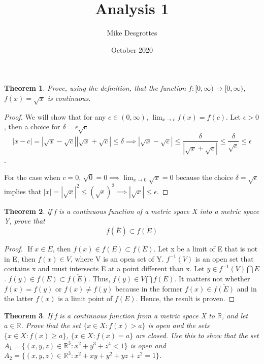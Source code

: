 \documentclass{article}
\title{Analysis 1}
\author{Mike Desgrottes}
\date{October 2020}
\theoremstyle{plain}
\newtheorem{theorem}{Theorem}
\theoremstyle{definition}
\begin{document}
\maketitle
 \section{}

 \begin{theorem}
	 Prove, using the definition, that the function $f:[0,\infty) \to [0, \infty)$, $f(x) = \sqrt{x}$ is continuous.
 \end{theorem}

 \begin{proof}
	 We will show that for any $c \in (0,\infty)$, $\lim_{x \to c} f(x) = f(c)$. Let $\epsilon > 0$, then a choice for $\delta = \epsilon\sqrt{c}$ $$ |x - c| = |\sqrt{x} - \sqrt{c}||\sqrt{x} + \sqrt{c}| \leq \delta \implies |\sqrt{x} - \sqrt{c}| \leq \frac{\delta}{|\sqrt{x} + \sqrt{c}|} \leq \frac{\delta}{\sqrt{c}}\leq \epsilon$$. 

	 For the case when $c = 0$, $\sqrt{0} = 0 \implies \lim_{x \to 0} \sqrt{x} = 0$ because the choice $\delta = \sqrt{\epsilon}$ implies that $|x| = |\sqrt{x}|^{2} \leq (\sqrt{\epsilon})^{2} \implies |\sqrt{x}| \leq \epsilon$.
 \end{proof}

\begin{theorem}
	if f is a continuous function of a metric space X into a metric space Y, prove that $$f(\overline{E}) \subset  \overline{f(E)} $$
\end{theorem}

\begin{proof}
	$ $\newline
	 If $x \in E$, then $f(x) \in f(E) \subset \overline{f(E)}$. Let x be a limit of E that is not in E, then $f(x) \in V$, where V is an open set of Y. $f^{-1}(V)$ is an open set that contains x and must intersects E at a point different than x. Let $y \in f^{-1}(V) \bigcap E$. $f(y) \in f(E) \subset \overline{f(E)}$. Thus, $f(y) \in V \bigcap f(E)$. It matters not whether $f(x) = f(y)$ or $f(x) \not = f(y)$ because in the former $f(x) \in \overline{f(E)}$ and in the latter $f(x)$ is a limit point of $f(E)$. Hence, the result is proven. 
\end{proof}
 \begin{theorem}
	 If f is a continuous function from a metric space X to $\mathbb{R}$, and let $a \in \mathbb{R}$. Prove that the set $\{ x\in X: f(x) > a\}$ is open and the sets $\{x \in X: f(x) \geq a\}$, $\{x \in X: f(x) = a \}$ are closed. Use this to show that the set $A_{1} = \{(x,y,z) \in \mathbb{R}^{3}: x^{2} + y^{3} + z^{4} < 1\}$ is open and $A_{2} = \{ (x,y,z) \in \mathbb{R}^{3}: x^{2} + xy + y^{2} + yz + z^{2} = 1\}$.
 \end{theorem}
\end{document}
